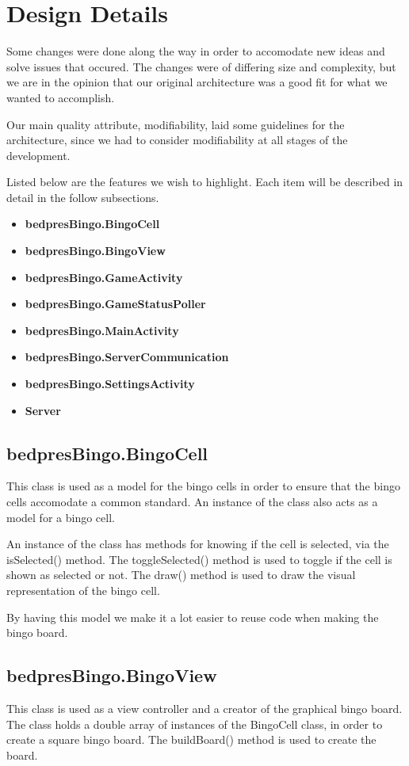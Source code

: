 \section{Design Details}
\label{designdetails}

Some changes were done along the way in order to accomodate new ideas and solve issues that occured. The changes were of differing size and complexity, but we are in the opinion that our original architecture was a good fit for what we wanted to accomplish. 

Our main quality attribute, modifiability, laid some guidelines for the architecture, since we had to consider modifiability at all stages of the development. 

Listed below are the features we wish to highlight.
Each item will be described in detail in the follow subsections.

\begin{itemize}
	\item \textbf{bedpresBingo.BingoCell} 
	\item \textbf{bedpresBingo.BingoView}
	\item \textbf{bedpresBingo.GameActivity}
  \item \textbf{bedpresBingo.GameStatusPoller} 
	\item \textbf{bedpresBingo.MainActivity} 
	\item \textbf{bedpresBingo.ServerCommunication}
  \item \textbf{bedpresBingo.SettingsActivity} 
	\item \textbf{Server} 
\end{itemize}


\subsection{bedpresBingo.BingoCell}
This class is used as a model for the bingo cells in order to ensure that the bingo cells accomodate a common standard. An instance of the class also acts as a model for a bingo cell. 

An instance of the class has methods for knowing if the cell is selected, via the isSelected() method. The toggleSelected() method is used to toggle if the cell is shown as selected or not. The draw() method is used to draw the visual representation of the bingo cell. 

By having this model we make it a lot easier to reuse code when making the bingo board.

\subsection{bedpresBingo.BingoView}
This class is used as a view controller and a creator of the graphical bingo board. The class holds a double array of instances of the BingoCell class, in order to create a square bingo board. The buildBoard() method is used to create the board. 

